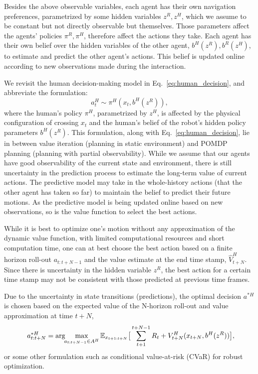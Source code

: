 \documentclass{article}
\newcommand{\argmax}{\arg\!\!\max}
\begin{document}
Besides the above observable variables, each agent has their own navigation preferences, parametrized by some hidden variables $z^R, z^H$, which we assume to be constant but not directly observable but themselves. Those parameters affect the agents' policies $\pi^R, \pi^H$, therefore affect the actions they take. Each agent has their own belief over the hidden variables of the other agent, $b^H(z^R), b^R(z^H)$, to estimate and predict the other agent's actions. This belief is updated online according to new observations made during the interaction. 

We revisit the human decision-making model in Eq.~\ref{eq:human_decision}, and abbreviate the formulation:
\begin{equation}
    a^H_t \sim \pi^{H} (x_t,b^H(z^R)),
\end{equation}
where the human's policy $\pi^H$, parametrized by $z^H$, is affected by the physical configuration of crossing $x_t$ and the human's belief of the robot's hidden policy parameters $b^H(z^R)$. This formulation, along with Eq.~\ref{eq:human_decision}, lie in between value iteration (planning in static environment) and POMDP planning (planning with partial observability). While we assume that our agents have good observability of the current state and environment, there is still uncertainty in the prediction process to estimate the long-term value of current actions. The predictive model may take in the whole-history actions (that the other agent has taken so far) to maintain the belief to predict their future motions. As the predictive model is being updated online based on new observations, so is the value function to select the best actions. 

While it is best to optimize one's motion without any approximation of the dynamic value function, with limited computational resources and short computation time, one can at best choose the best action based on a finite horizon roll-out $a_{t:t+N-1}$ and the value estimate at the end time stamp, $\hat{V}^H_{t+N}$. Since there is uncertainty in the hidden variable $z^R$, the best action for a certain time stamp may not be consistent with those predicted at previous time frames. 

Due to the uncertainty in state transitions (predictions), the optimal decision $a^{*H}$ is chosen based on the expected value of the N-horizon roll-out and value approximation at time $t+N$,
\begin{equation}~\label{eq:N_horizon}
a^{*H}_{t:t+N} = \argmax_{a_{t:t+N-1} \in A^H} \mathbb{E}_{x_{t+1:t+N}}\big{[}\sum_{t+1}^{t+N-1} R_t+V^H_{t+N}(x_{t+N}, b^H(z^R))\big{]},
\end{equation}
or some other formulation such as conditional value-at-risk (CVaR) for robust optimization. 
\end{document}
